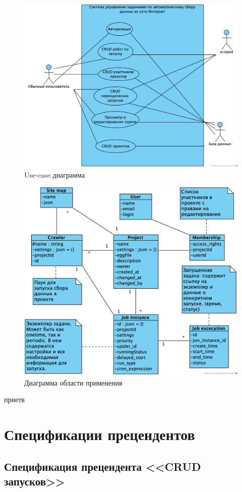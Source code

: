 \documentclass[a4paper,12pt]{article}
\begin{document}
	\begin{figure}[H]
		\centering
		\includegraphics[width = 0.8\linewidth]{img/uml/UseCase.png}
		\caption{Use-case диаграмма}
		\label{pic: usecase}
	\end{figure}
	
	\begin{figure}[h]
		\centering
		\includegraphics[width = 0.8\linewidth]{img/ClassDiagram.png}
		\caption{Диаграмма области применения}
		\label{pic: classdiagram}
	\end{figure}
	
	приетв
	
	
	\section*{Спецификации прецендентов} \label{s: spec}
	
	\subsection*{Спецификация прецендента <<CRUD запусков>>}
	
\end{document}
